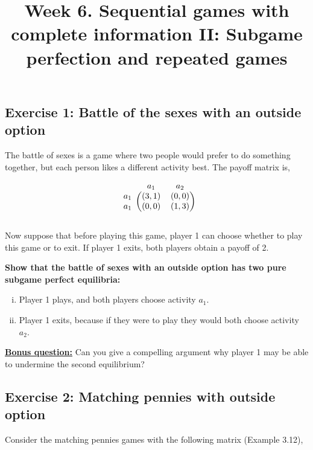 \documentclass[10pt]{article}
\title{\textbf{Week 6.} Sequential games with complete information II: Subgame perfection and repeated games}
\date{}
\begin{document}
\maketitle
\vspace{-1cm}

\subsection*{Exercise 1: Battle of the sexes with an outside option}

The battle of sexes is a game where two people would prefer to do something
together, but each person likes a different activity best. The payoff matrix is,

\begin{equation*}
    \begin{blockarray}{ccc}
        & a_1 & a_2 \\
        \begin{block}{c(cc)}
            a_1 & (3, 1) & (0, 0) \\
            a_1 & (0, 0) & (1, 3) \\
        \end{block}
    \end{blockarray}
\end{equation*}

Now suppose that before playing this game, player 1 can choose whether to play
this game or to exit. If player 1 exits, both players obtain a payoff of 2.

\textbf{Show that the battle of sexes with an outside option has two pure
subgame perfect equilibria:}

\begin{enumerate}[(i)]
    \item Player 1 plays, and both players choose activity \(a_1\).
    \item Player 1 exits, because if they were to play they would both choose
    activity \(a_2\).
\end{enumerate}

\underline{\textbf{Bonus question:}} Can you give a compelling argument why
player 1 may be able to undermine the second equilibrium?

\subsection*{Exercise 2: Matching pennies with outside option}

Consider the matching pennies games with the following matrix (Example 3.12),
\end{document}

